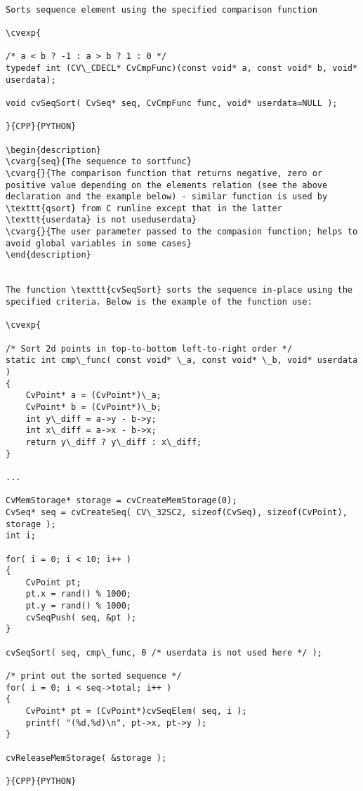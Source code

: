 \begin{verbatim}

Sorts sequence element using the specified comparison function

\cvexp{

/* a < b ? -1 : a > b ? 1 : 0 */
typedef int (CV\_CDECL* CvCmpFunc)(const void* a, const void* b, void* userdata);

void cvSeqSort( CvSeq* seq, CvCmpFunc func, void* userdata=NULL );

}{CPP}{PYTHON}

\begin{description}
\cvarg{seq}{The sequence to sortfunc}
\cvarg{}{The comparison function that returns negative, zero or positive value depending on the elements relation (see the above declaration and the example below) - similar function is used by \texttt{qsort} from C runline except that in the latter \texttt{userdata} is not useduserdata}
\cvarg{}{The user parameter passed to the compasion function; helps to avoid global variables in some cases}
\end{description}


The function \texttt{cvSeqSort} sorts the sequence in-place using the specified criteria. Below is the example of the function use:

\cvexp{

/* Sort 2d points in top-to-bottom left-to-right order */
static int cmp\_func( const void* \_a, const void* \_b, void* userdata )
{
    CvPoint* a = (CvPoint*)\_a;
    CvPoint* b = (CvPoint*)\_b;
    int y\_diff = a->y - b->y;
    int x\_diff = a->x - b->x;
    return y\_diff ? y\_diff : x\_diff;
}

...

CvMemStorage* storage = cvCreateMemStorage(0);
CvSeq* seq = cvCreateSeq( CV\_32SC2, sizeof(CvSeq), sizeof(CvPoint), storage );
int i;

for( i = 0; i < 10; i++ )
{
    CvPoint pt;
    pt.x = rand() % 1000;
    pt.y = rand() % 1000;
    cvSeqPush( seq, &pt );
}

cvSeqSort( seq, cmp\_func, 0 /* userdata is not used here */ );

/* print out the sorted sequence */
for( i = 0; i < seq->total; i++ )
{
    CvPoint* pt = (CvPoint*)cvSeqElem( seq, i );
    printf( "(%d,%d)\n", pt->x, pt->y );
}

cvReleaseMemStorage( &storage );

}{CPP}{PYTHON}


\end{verbatim}
